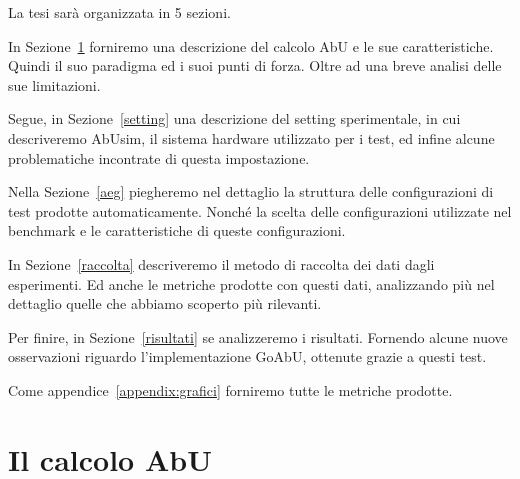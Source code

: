 \documentclass[target=bach]{thud}
\begin{document}
La tesi sarà organizzata in 5 sezioni.

In Sezione~\ref{sec:calculus} forniremo una descrizione del calcolo AbU e le sue caratteristiche. Quindi il suo paradigma ed i suoi punti di forza. Oltre ad una breve analisi delle sue limitazioni.

Segue, in Sezione~\ref{setting} una descrizione del setting sperimentale, in cui descriveremo AbUsim, il sistema hardware utilizzato per i test, ed infine alcune problematiche incontrate di questa impostazione.

Nella Sezione~\ref{aeg} piegheremo nel dettaglio la struttura delle configurazioni di test prodotte automaticamente. Nonché la scelta delle configurazioni utilizzate nel benchmark e le caratteristiche di queste configurazioni.

In Sezione~\ref{raccolta} descriveremo il metodo di raccolta dei dati dagli esperimenti. Ed anche le metriche prodotte con questi dati, analizzando più nel dettaglio quelle che abbiamo scoperto più rilevanti.

Per finire, in Sezione~\ref{risultati} se analizzeremo i risultati. Fornendo alcune nuove osservazioni riguardo l'implementazione GoAbU, ottenute grazie a questi test.

Come appendice~\ref{appendix:grafici} forniremo tutte le metriche prodotte.

\chapter{Il calcolo AbU}\label{sec:calculus}
\end{document}
